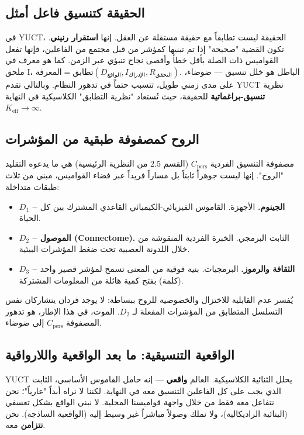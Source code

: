 \documentclass[12pt,a4paper]{article}
\newcommand{\Keff}{K_{\mathrm{eff}}}
\begin{document}
	\subsection{الحقيقة كتنسيق فاعل أمثل}
	
	في YUCT، الحقيقة ليست تطابقاً مع حقيقة مستقلة عن العقل. إنها \textbf{استقرار رنيني}. تكون القضية "صحيحة" إذا تم تبنيها كمؤشر من قبل مجتمع من الفاعلين، فإنها تفعل القواميس ذات الصلة بأقل خطأ وأقصى نجاح تنبؤي عبر الزمن. كما هو معرف في ملحق I، \(\text{المعرفة} = \text{تطابق}(D_{\text{الواقع}}, I_{\text{الإدراك}}, R_{\text{التحقق}})\). الباطل هو خلل تنسيق — ضوضاء، على مدى زمني طويل، تتسبب حتماً في تدهور النظام. وبالتالي تقدم YUCT نظرية \textbf{تنسيق-براغماتية} للحقيقة، حيث تُستعاد "نظرية التطابق" الكلاسيكية في النهاية \(\Keff \to \infty\).
	
	\subsection{الروح كمصفوفة طبقية من المؤشرات}
	
	مصفوفة التنسيق الفردية \(C_{\mathrm{pers}}\) (القسم 2.5 من النظرية الرئيسية) هي ما يدعوه التقليد "الروح". إنها ليست جوهراً ثابتاً بل مساراً فريداً عبر فضاء القواميس، مبني من ثلاث طبقات متداخلة:
	
	\begin{itemize}[leftmargin=*]
		\item \textbf{\(D_1\) – الجينوم.} الأجهزة. القاموس الفيزيائي-الكيميائي القاعدي المشترك بين كل الحياة.
		\item \textbf{\(D_2\) – الموصول (Connectome).} الثابت البرمجي. الخبرة الفردية المنقوشة من خلال اللدونة العصبية تحت ضغط المؤشرات البيئية.
		\item \textbf{\(D_3\) – الثقافة والرموز.} البرمجيات. بنية فوقية من المعنى تسمح لمؤشر قصير واحد (كلمة) بفتح كمية هائلة من المعلومات المشتركة.
	\end{itemize}
	
	يُفسر عدم القابلية للاختزال والخصوصية للروح ببساطة: لا يوجد فردان يتشاركان نفس التسلسل المتطابق من المؤشرات المفعلة لـ \(D_2\). الموت، في هذا الإطار، هو تدهور المصفوفة \(C_{\mathrm{pers}}\) إلى ضوضاء.
	
	\subsection{الواقعية التنسيقية: ما بعد الواقعية واللارواقية}
	
	YUCT يحلل الثنائية الكلاسيكية. العالم \textbf{واقعي} — إنه حامل القاموس الأساسي، الثابت الذي يجب على كل الفاعلين التنسيق معه في النهاية. لكننا لا نراه أبداً "عارياً"؛ نحن نتفاعل معه فقط من خلال واجهة قواميسنا المحلية. لا نبني الواقع بشكل تعسفي (البنائية الراديكالية)، ولا نملك وصولاً مباشراً غير وسيط إليه (الواقعية الساذجة). نحن \textbf{نتزامن} معه.
	
\end{document}
